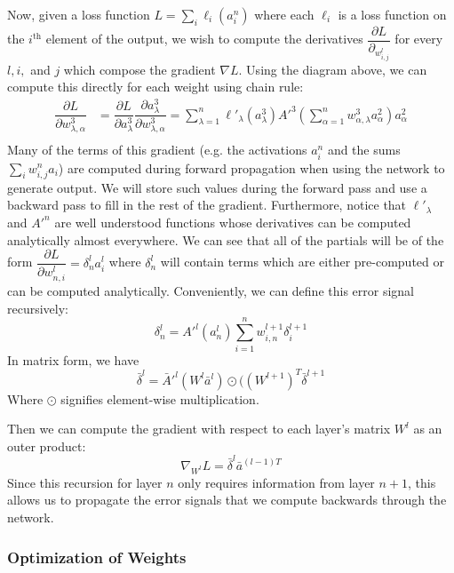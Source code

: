 Now, given a loss function $L = \sum_{i} \ell_i(a^n_i)$ where each $\ell_i$ is a loss function on the $i^{\text{th}}$ element of the output, we wish to compute the derivatives $\dfrac{\partial L}{\partial_{w^l_{i,j}}}$ for every $l, i,$ and $j$ which compose the gradient $\nabla L$. Using the diagram above, we can compute this directly for each weight using chain rule:
\begin{align*}
    \dfrac{\partial L}{\partial w^3_{\lambda,\alpha}} &= \dfrac{\partial L}{\partial a^3_{\lambda}} \dfrac{\partial a^3_{\lambda}}{\partial w^3_{\lambda,\alpha}} = \sum_{\lambda=1}^n \ell'_\lambda( a^3_\lambda) A'^3 (\sum_{\alpha=1}^n w^3_{\alpha, \lambda} a_\alpha^2) a^2_\alpha\\    
\end{align*}
Many of the terms of this gradient (e.g. the activations $a^n_i$ and the sums $\sum_{i} w^n_{i,j} a_i$) are computed during forward propagation when using the network to generate output. 
We will store such values during the forward pass and use a backward pass to fill in the rest of the gradient. Furthermore, notice that $\ell'_\lambda$ and $A'^n$ are well understood functions 
whose derivatives can be computed analytically almost everywhere. We can see that all of the partials will be of the form 
$\dfrac{\partial L}{\partial w^l_{n, i}} = \delta^l_n a^l_i$ where $\delta^l_n$  will contain terms which are either pre-computed or can be computed analytically. Conveniently, we can define this error signal recursively: 
\[
\delta^l_n = A'^l (a^l_{n}) \sum_{i = 1}^n w^{l+1}_{i, n} \delta^{l+1}_i
\]
In matrix form, we have
\[\bar \delta^l = \bar A'^l(W^l \bar a^l) \odot ((W^{l+1})^T \bar \delta^{l+1}\]
Where $\odot$ signifies element-wise multiplication. 

Then we can compute the gradient with respect to each layer's matrix $W^l$ as an outer product: 
\[\nabla_{W^l} L = \bar \delta^l \bar a^{(l-1)T}\]
Since this recursion for layer $n$ only requires information from layer $n+1$, this allows us to propagate the error signals that we compute backwards through the network. 


\subsubsection{Optimization of Weights}

